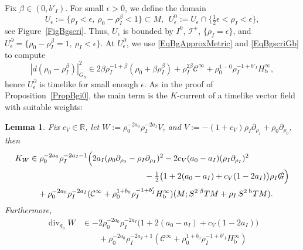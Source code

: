 \documentclass[reqno,11pt,letterpaper]{amsart}
\numberwithin{equation}{section}
\numberwithin{figure}{section}
\newtheorem{lemma}[thm]{Lemma}
\theoremstyle{definition}
\theoremstyle{remark}
\newcommand{\mc}{\mathcal}
\newcommand{\cC}{\mc C}
\newcommand{\ms}{\mathscr}
\newcommand{\scri}{\ms I}
\newcommand{\R}{\mathbb{R}}
\newcommand{\slG}{\slashed{G}{}}
\newcommand{\dv}{\operatorname{div}}
\newcommand{\eps}{\epsilon}
\newcommand{\pa}{\partial}
\newcommand{\bop}{{\mathrm{b}}}
\newcommand{\Tb}{{}^{\bop}T}
\newcommand{\Tbeta}{{}^{\beta}T}
\newcommand{\half}{\tfrac{1}{2}}
\newcommand{\CI}{\cC^\infty}
\newcommand{\Hb}{H_{\bop}}
\begin{document}
Fix $\beta\in(0,b'_I)$. For small $\eps>0$, we define the domain
\begin{equation}
\label{EqBgscriDom}
  U_\eps := \{ \rho_I < \eps,\ \rho_0-\rho_I^\beta<1 \} \subset M,\ \ 
  U_\eps^0 := U_\eps \cap \{ \half\eps < \rho_I < \eps \},
\end{equation}
see Figure~\ref{FigBgscri}. Thus, $U_\eps$ is bounded by $I^0$, $\scri^+$, $\{\rho_I=\eps\}$, and $U^\pa_\eps=\{\rho_0-\rho_I^\beta=1,\ \rho_I<\eps\}$. At $U^\pa_\eps$, we use \eqref{EqBgApproxMetric} and \eqref{EqBgscriGb} to compute
\begin{equation}
\label{EqBgscriFinalDefFn}
  |d(\rho_0-\rho_I^\beta)|_{G_\bop}^2 \in 2\beta\rho_I^{-1+\beta}(\rho_0+\beta\rho_I^\beta) + \rho_I^{2\beta}\CI + \rho_0^{1-0}\rho_I^{-1+b'_I}\Hb^\infty,
\end{equation}
hence $U_\eps^\pa$ is timelike for small enough $\eps$. As in the proof of Proposition~\ref{PropBgi0}, the main term is the $K$-current of a timelike vector field with suitable weights:

\begin{lemma}
\label{LemmaBgscriKCurrent}
  Fix $c_V\in\R$, let $W:=\rho_0^{-2 a_0}\rho_I^{-2 a_I} V$, and $V:=-(1+c_V)\rho_I\pa_{\rho_I}+\rho_0\pa_{\rho_0}$, then
  \begin{equation}
  \label{EqBgscriKCurrent}
  \begin{split}
    K_W &\in \rho_0^{-2 a_0}\rho_I^{-2 a_I-1}\Bigl(2 a_I(\rho_0\pa_{\rho_0}-\rho_I\pa_{\rho_I})^2 - 2 c_V(a_0-a_I)(\rho_I\pa_{\rho_I})^2 \\
      &\hspace{14em} -\half\bigl(1+2(a_0-a_I)+c_V(1-2 a_I)\bigr)\rho_I\slG\Bigr) \\
      &\quad + \rho_0^{-2 a_0}\rho_I^{-2 a_I}(\CI+\rho_0^{1+b_0}\rho_I^{-1+b'_I}\Hb^\infty)(M;S^2\,\Tbeta M + \rho_I\,S^2\,\Tb M).
  \end{split}
  \end{equation}
  Furthermore,
  \begin{equation}
  \label{EqBgscriKCurrentDiv}
  \begin{split}
    \dv_{g_\bop}W &\in -2\rho_0^{-2 a_0}\rho_I^{-2 a_I}\bigl(1+2(a_0-a_I)+c_V(1-2 a_I) \bigr) \\
      &\qquad + \rho_0^{-2 a_0}\rho_I^{-2 a_I+1}(\CI+\rho_0^{1+b_0}\rho_I^{-1+b'_I}\Hb^\infty)
   \end{split}
   \end{equation}
\end{lemma}
\end{document}
